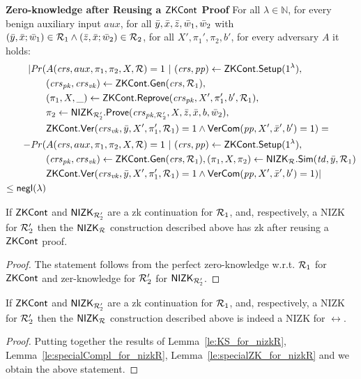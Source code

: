 \noindent \textbf{Zero-knowledge after Reusing a ${\mathsf{ZKCont}}$ Proof} For all $\lambda \in \mathbb{N}$, for every benign auxiliary input $aux$, 
for all $\bar{y},\bar{x},\bar{z}, \bar{w}_1, \bar{w}_2$ with $(\bar{y}, \bar{x}; \bar{w}_1) \in \mathcal{R}_1 \wedge (\bar{z}, \bar{x}; \bar{w}_2) \in \mathcal{R}_2$, for all $X',\pi_1',\pi_2, b'$, for every adversary $A$ it holds:
\begin{align*}
| \mathit{Pr}(& A(\mathit{crs}, aux, \pi_1,\pi_2, X, \mathcal{R}) = 1 \ | \ (\mathit{crs}, \mathit{pp}) \leftarrow {\ensuremath{\mathsf{ZKCont}}}.{\mathsf{Setup}} (1^{\lambda}), \\
                  & (\mathit{crs}_{\mathit{pk}}, \mathit{crs}_{\mathit{vk}}) \leftarrow {\ensuremath{\mathsf{ZKCont}}}.\mathsf{Gen}(\mathit{crs}, \mathcal{R}_1), \\
                  &(\pi_1, X, \_) \leftarrow {\ensuremath{\mathsf{ZKCont}}}.{\mathsf{Reprove}} (\mathit{crs}_{\mathit{pk}}, X', \pi_1', b', \mathcal{R}_1), \\
                  & \pi_2 \leftarrow {\ensuremath{\mathsf{NIZK_{\mathcal{R}'_2}}}}.{\mathsf{Prove}}(\mathit{crs}_{\mathit{pk},{\mathcal{R}'_2}}, X, \bar{z}, \bar{x}, b, \bar{w}_2), \\
                  &  {\mathsf{ZKCont}}.{\mathsf{Ver}}(\mathit{crs}_{\mathit{vk}}, \bar{y}, X', \pi'_1, \mathcal{R}_1) = 1 
                  \wedge {\ensuremath{\mathsf{VerCom}}}(\mathit{pp}, X', \bar{x}', b') = 1) =  \\
- \mathit{Pr}(& A(\mathit{crs}, aux, \pi_1,\pi_2, X, \mathcal{R}) = 1 \ | \ (\mathit{crs}, \mathit{pp}) \leftarrow {\ensuremath{\mathsf{ZKCont}}}.{\mathsf{Setup}} (1^{\lambda}), \\ 
                     & (\mathit{crs}_{\mathit{pk}}, \mathit{crs}_{\mathit{vk}}) \leftarrow {\ensuremath{\mathsf{ZKCont}}}.\mathsf{Gen}(\mathit{crs}, \mathcal{R}_1), (\pi_1, X,\pi_2) \leftarrow {\ensuremath{\mathsf{NIZK_{\mathcal{R}}}}}.{\mathsf{Sim}}(\mathit{td}, \bar{y}, \mathcal{R}_1) \\ 
                     &  {\mathsf{ZKCont}}.{\mathsf{Ver}}(\mathit{crs}_{\mathit{vk}}, \bar{y}, X', \pi'_1, \mathcal{R}_1) = 1
                    \wedge {\ensuremath{\mathsf{VerCom}}}(\mathit{pp}, X', \bar{x}', b') = 1) | \\
                    \leq \mathsf{negl}(\lambda)
\end{align*}


\begin{lemma} 
\label{le:specialZK_for_nizkR}
If ${\mathsf{ZKCont}}$ and ${\mathsf{NIZK_{\mathcal{R}'_2}}}$ are a zk continuation for $\mathcal{R}_1$, and, respectively, a NIZK 
for $\mathcal{R}_2'$ then the ${\mathsf{NIZK_{\mathcal{R}}}}$ construction described above has zk after reusing a ${\mathsf{ZKCont}}$ proof.
\end{lemma} 
\begin{proof} The statement follows from the perfect zero-knowledge w.r.t. $\mathcal{R}_1$ for ${\mathsf{ZKCont}}$ and zer-knowledge for $\mathcal{R}_2'$ for ${\mathsf{NIZK_{\mathcal{R}'_2}}}$.
\end{proof}
 
\begin{corollary}If ${\mathsf{ZKCont}}$ and ${\mathsf{NIZK_{\mathcal{R}'_2}}}$ are a zk continuation for $\mathcal{R}_1$, and, respectively, a NIZK 
for $\mathcal{R}_2'$ then the ${\mathsf{NIZK_{\mathcal{R}}}}$ construction described above is indeed a NIZK for $\rel$.
 \end{corollary}
 
\begin{proof} Putting together the results of Lemma~\ref{le:KS_for_nizkR}, Lemma~\ref{le:specialCompl_for_nizkR}, 
Lemma~\ref{le:specialZK_for_nizkR} and  we obtain the above statement.
\end{proof} 
